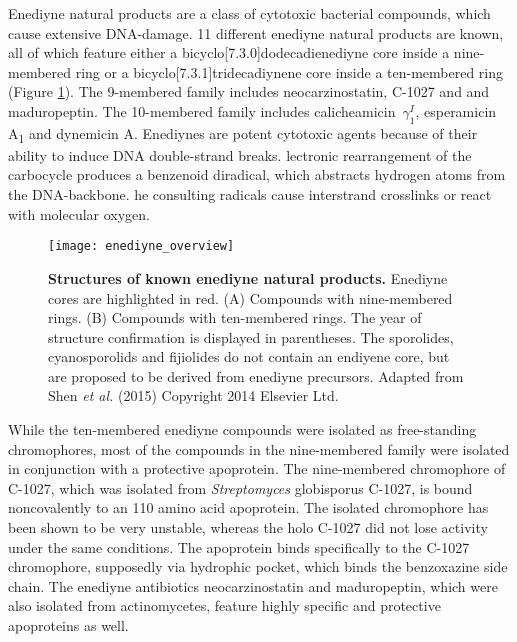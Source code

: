 Enediyne natural products are a class of cytotoxic bacterial compounds, which cause extensive DNA-damage.\autocite{Liang2010,Gredicak2007,AdrianL.Smith*1996,Nicolaou1993}
11 different enediyne natural products are known, all of which feature either a bicyclo[7.3.0]dodecadienediyne core inside a nine-membered ring or a bicyclo[7.3.1]tridecadiynene core inside a ten-membered ring (Figure \ref{fig:enediyne_comparison}).
The 9-membered family includes neocarzinostatin, C-1027 and and maduropeptin.
The 10-membered family includes calicheamicin~$\gamma_{1}^{I}$, esperamicin A\textsubscript{1} and dynemicin A.\autocite{Liang2010}
Enediynes are potent cytotoxic agents because of their ability to induce DNA double-strand breaks.\autocite{Shen2015}
lectronic rearrangement of the carbocycle produces a benzenoid diradical, which abstracts hydrogen atoms from the DNA-backbone.
he consulting radicals cause interstrand crosslinks or react with molecular oxygen.
\begin{figure}[htbp]
	\centering
	\texttt{[image: enediyne\_overview]}
	\caption[Structures of known enediyne natural products]{%
		\textbf{Structures of known enediyne natural products.}
		Enediyne cores are highlighted in red.
		(A) Compounds with nine-membered rings.
		(B) Compounds with ten-membered rings.
		The year of structure confirmation is displayed in parentheses.
		The sporolides, cyanosporolids and fijiolides do not contain an endiyene core, but are proposed to be derived from enediyne precursors.
		Adapted from Shen \textit{et al.} (2015) Copyright 2014 Elsevier Ltd.}
	\label{fig:enediyne_comparison}
\end{figure}
While the ten-membered enediyne compounds were isolated as free-standing chromophores, most of the compounds in the nine-membered family were isolated in conjunction with a protective apoprotein.\autocite{Liang2010}
The nine-membered chromophore of C-1027, which was isolated from \textit{Streptomyces} globisporus C-1027, is bound noncovalently to an 110 amino acid apoprotein.\autocite{AdrianL.Smith*1996,Minami1993,Yoshida1993,Otani1993,Sugiura1993,Matsumoto1993,Otani1991,Otani1988a,Matsumoto1993a}
The isolated chromophore has been shown to be very unstable, whereas the holo C-1027 did not lose activity under the same conditions.\autocite{Matsumoto1993,Sugiura1993,Otani1991}
The apoprotein binds specifically to the C-1027 chromophore, supposedly via hydrophic pocket, which binds the benzoxazine side chain.\autocite{Okuno1994,Matsumoto1993}
The enediyne antibiotics neocarzinostatin and maduropeptin, which were also isolated from actinomycetes, feature highly specific and protective apoproteins as well.\autocite{AdrianL.Smith*1996}

